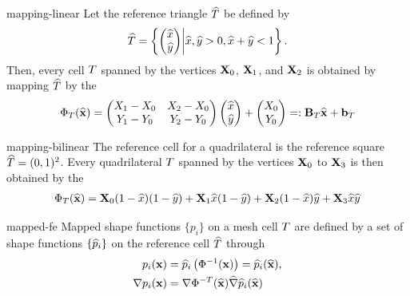\begin{Example}{mapping-linear}
  Let the reference triangle $\widehat{T}$ be defined by
  \begin{gather}
    \widehat{T} = \left\{
      \begin{pmatrix}
        \widehat{x}\\\widehat{y}
      \end{pmatrix}
      \middle|
      \widehat{x},\widehat{y} >0, \widehat{x}+\widehat{y} < 1
    \right\}.
  \end{gather}
  Then, every cell $T$ spanned by the vertices $\mathbf X_0$,
  $\mathbf X_1$, and $\mathbf X_2$ is obtained by mapping $\widehat{T}$ by
  the 
  \begin{gather}
    \Phi_T(\widehat{\mathbf x}) =
    \begin{pmatrix}
      X_1-X_0 & X_2 - X_0 \\ Y_1-Y_0 & Y_2 - Y_0
    \end{pmatrix}
    \begin{pmatrix}
      \widehat{x} \\ \widehat{y}
    \end{pmatrix}
    +
    \begin{pmatrix}
      X_0 \\ Y_0
    \end{pmatrix} =: \mathbf B_T \widehat{\mathbf x} + \mathbf b_T
  \end{gather}
\end{Example}

\begin{Example}{mapping-bilinear}
  The reference cell for a quadrilateral is the reference square
  $\widehat{T} = (0,1)^2$. Every quadrilateral $T$ spanned by the
  vertices $\mathbf X_0$ to $\mathbf X_3$ is then obtained by the
  \begin{gather}
    \Phi_T(\widehat{\mathbf x})
    = \mathbf X_0 (1-\widehat{x})(1-\widehat{y})
    + \mathbf X_1 \widehat{x}(1-\widehat{y})
    + \mathbf X_2 (1-\widehat{x})\widehat{y}
    + \mathbf X_3 \widehat{x}\widehat{y}
  \end{gather}
\end{Example}

\begin{Definition}{mapped-fe}
  Mapped shape functions $\{p_i\}$ on a mesh cell $T$ are defined by a
  set of shape functions $\{\widehat{p}_i\}$ on the reference cell
  $\widehat{T}$ through 
  \begin{gather}
    \begin{split}
      p_i(\mathbf x) &= \widehat{p}_i\left(\Phi^{-1}(\mathbf x)\right) = \widehat{p}_i(\widehat{\mathbf x}),\\
      \nabla p_i(\mathbf x) &= \nabla\Phi^{-T}(\widehat{\mathbf x})\widehat{\nabla}\widehat{p}_i(\widehat{\mathbf x})
    \end{split}
  \end{gather}
\end{Definition}

